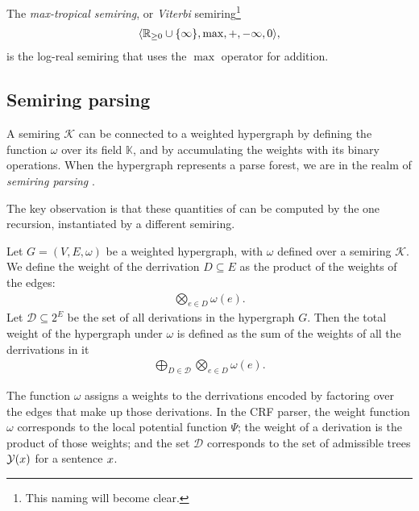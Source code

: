   \begin{example}{}
    The \textit{max-tropical semiring}, or \textit{Viterbi} semiring\footnote{This naming will become clear.}
    \begin{align*}
      \langle \mathbb{R}_{\geq 0} \cup \{ \infty \}, \max, +, -\infty, 0 \rangle,
    \end{align*}
    is the log-real semiring that uses the $\max$ operator for addition.
  \end{example}

\subsection{Semiring parsing}
  A semiring $\mathcal{K}$ can be connected to a weighted hypergraph by defining the function $\omega$ over its field $\mathbb{K}$, and by accumulating the weights with its binary operations. When the hypergraph represents a parse forest, we are in the realm of \textit{semiring parsing} \citep{goodman1999semiring}.

  The key observation is that these quantities of can be computed by the one recursion, instantiated by a different semiring.

  \begin{definition}{} Let $G = (V, E, \omega)$ be a weighted hypergraph, with $\omega$ defined over a semiring $\mathcal{K}$. We define the weight of the derrivation $D \subseteq E$ as the product of the weights of the edges:
  \begin{align*}
    \bigotimes_{e \in D} \omega(e).
  \end{align*}
  Let $\mathcal{D} \subseteq 2^E$ be the set of all derivations in the hypergraph $G$. Then the total weight of the hypergraph under $\omega$ is defined as the sum of the weights of all the derrivations in it
  \begin{align*}
    \bigoplus_{D \in \mathcal{D}} \bigotimes_{e \in D} \omega(e).
  \end{align*}
  \end{definition}

  The function $\omega$ assigns a weights to the derrivations encoded by factoring over the edges that make up those derivations. In the CRF parser, the weight function $\omega$ corresponds to the local potential function $\Psi$; the weight of a derivation is the product of those weights; and the set $\mathcal{D}$ corresponds to the set of admissible trees $\mathcal{Y}(x)$ for a sentence $x$.

